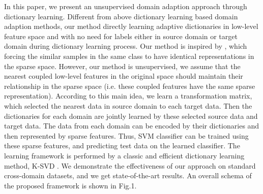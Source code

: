 \documentclass{article}
\begin{document}
             
In this paper, we present an unsupervised domain adaption approach through dictionary learning. Different from above dictionary learning based domain adaption methods, our method directly learning adaptive dictionaries in low-level feature space and with no need for labels either in source domain or target domain during dictionary learning process. Our method is inspired by \cite{zhu2013enhancing,zhu2014weakly}, which forcing the similar samples in the same class to have identical representations in the sparse space. However, our method is unsupervised, we assume that the nearest coupled low-level features in the original space should maintain their relationship in the sparse space (i.e. these coupled features have the same sparse representation).  According to this main idea, we learn a transformation matrix, which selected the nearest data in source domain to each target data. Then the dictionaries for each domain are jointly learned by these selected source data and target data. The data from each domain can be encoded by their dictionaries and then represented by sparse features. Thus, SVM classifier can be trained using these sparse features, and predicting test data on the learned classifier. The learning framework is performed by a classic and efficient dictionary learning method, K-SVD \cite{aharon2006svd}. We demonstrate the effectiveness of our approach on standard cross-domain datasets, and we get state-of-the-art results.  An overall schema of the proposed framework is shown in Fig.1.





\end{document}
